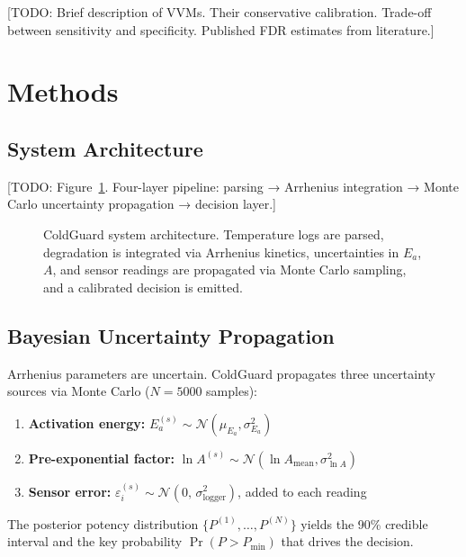 \documentclass[12pt,a4paper]{article}
\begin{document}
[TODO: Brief description of VVMs. Their conservative calibration. Trade-off
between sensitivity and specificity. Published FDR estimates from literature.]

\section{Methods}
\label{sec:methods}

\subsection{System Architecture}

[TODO: Figure~\ref{fig:architecture}. Four-layer pipeline: parsing → Arrhenius
integration → Monte Carlo uncertainty propagation → decision layer.]

\begin{figure}[H]
  \centering
  \caption{ColdGuard system architecture. Temperature logs are parsed, degradation
    is integrated via Arrhenius kinetics, uncertainties in $E_a$, $A$, and sensor
    readings are propagated via Monte Carlo sampling, and a calibrated decision is
    emitted.}
  \label{fig:architecture}
\end{figure}

\subsection{Bayesian Uncertainty Propagation}

Arrhenius parameters are uncertain. ColdGuard propagates three uncertainty
sources via Monte Carlo ($N = 5000$ samples):

\begin{enumerate}
  \item \textbf{Activation energy:} $E_a^{(s)} \sim \mathcal{N}(\mu_{E_a}, \sigma_{E_a}^2)$
  \item \textbf{Pre-exponential factor:} $\ln A^{(s)} \sim \mathcal{N}(\ln A_\text{mean}, \sigma_{\ln A}^2)$
  \item \textbf{Sensor error:} $\varepsilon_i^{(s)} \sim \mathcal{N}(0,\,\sigma_\text{logger}^2)$, added to each reading
\end{enumerate}

The posterior potency distribution $\{P^{(1)}, \ldots, P^{(N)}\}$ yields the
90\% credible interval and the key probability $\Pr(P > P_\text{min})$ that drives
the decision.
\end{document}
